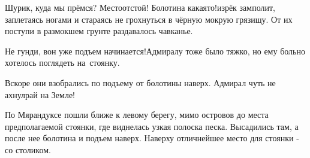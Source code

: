 \diagdash Шурик, куда мы прёмся? Место\mdash отстой! Болотина какая\sdash то!\mdash изрёк замполит, заплетаясь ногами и стараясь не грохнуться в чёрную мокрую грязищу. От их поступи в размокшем грунте раздавалось чавканье.

\diagdash Не гунди, вон уже подъем начинается!\mdash Адмиралу тоже было тяжко, но ему больно хотелось поглядеть на~стоянку. 

Вскоре они взобрались по подъему от болотины наверх. Адмирал чуть не ахнул\mdash рай на Земле!
















\vspace{5 cm}

По Мярандуксе пошли ближе к левому берегу, мимо островов до места предполагаемой стоянки, где виднелась узкая полоска песка. Высадились там, а после нее болотина и подъем наверх. Наверху отличнейшее место для стоянки - со столиком. 

\begin{center}
\end{center}
